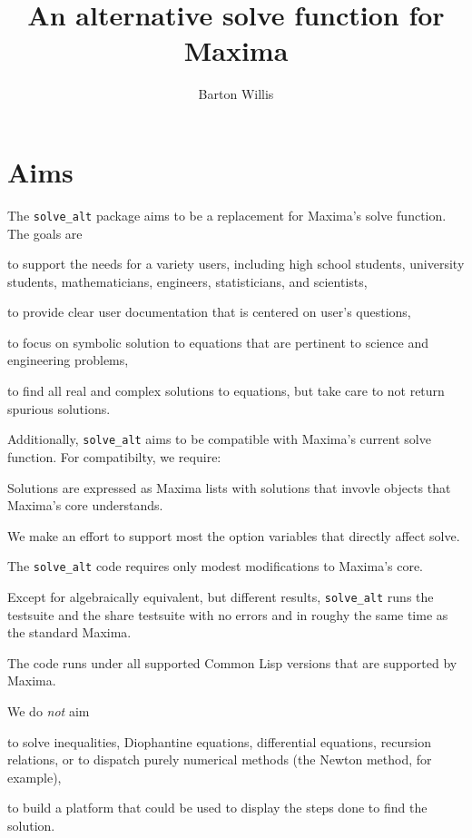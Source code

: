 \documentclass[]{scrartcl}
\title{An alternative solve function for Maxima}
\author{Barton Willis}
\newcommand{\altsolve}{\texttt{solve\_alt}}
\begin{document}
\maketitle

\section{Aims}

The \altsolve\/ package aims to be a replacement for Maxima's solve function. The goals are

\begin{alphalist}[]

\item to support the needs for a variety users, including high school students, university students, mathematicians, engineers, statisticians, and scientists,

\item to provide clear user documentation that is centered  on user's questions,

\item to focus on symbolic solution to equations that are pertinent to science and engineering problems,

\item to find all real and complex solutions to equations, but take care to not return spurious solutions.

\end{alphalist}
Additionally, \altsolve\/  aims to be compatible with Maxima's current solve function. For compatibilty, we require:

\begin{alphalist}[]

\item Solutions are expressed as Maxima lists with solutions that invovle objects that Maxima's core  understands.

\item We make an effort to support most the option variables that directly affect solve.

 \item The \altsolve\/ code requires only modest modifications to Maxima's core.

\item Except for algebraically equivalent, but different results, \altsolve\/  runs the testsuite and the share testsuite with no errors and in roughy the same time as the standard Maxima.

\item The code runs under all supported Common Lisp versions that are supported by Maxima.
\end{alphalist}
We do \emph{not} aim
\begin{alphalist}[]

\item to solve inequalities, Diophantine equations, differential equations, recursion relations, or to dispatch purely numerical methods (the Newton method, for example),

\item to build a platform that could be used to display the steps done to find the solution.

\end{alphalist}
\end{document}
